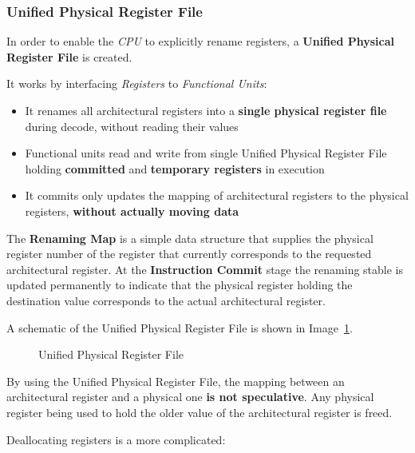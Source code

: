\documentclass[english]{article}
\begin{document}
\subsubsection{Unified Physical Register File}

In order to enable the \textit{CPU} to explicitly rename registers, a \textbf{Unified Physical Register File} is created.

It works by interfacing \textit{Registers} to \textit{Functional Units}:

\begin{itemize}
  \item It renames all architectural registers into a \textbf{single physical register file} during decode, without reading their values
  \item Functional units read and write from single Unified Physical Register File holding \textbf{committed} and \textbf{temporary registers} in execution
  \item It commits only updates the mapping of architectural registers to the physical registers, \textbf{without actually moving data}
\end{itemize}

The \textbf{Renaming Map} is a  simple data structure that supplies the physical register number of the register that currently corresponds to the requested architectural register.
At the \textbf{Instruction Commit} stage the renaming stable is updated permanently to indicate that the physical register holding the destination value corresponds to the actual architectural register.

A schematic of the Unified Physical Register File is shown in Image~\ref{fig:unified-physical-register-file}.

\begin{figure}[htbp]
  \bigskip
  \centering
  \caption{Unified Physical Register File}
  \label{fig:unified-physical-register-file}
  \bigskip
\end{figure}

\bigskip
By using the Unified Physical Register File, the mapping between an architectural register and a physical one \textbf{is not speculative}.
Any physical register being used to hold the older value of the architectural register is freed.

Deallocating registers is a more complicated:
\end{document}
